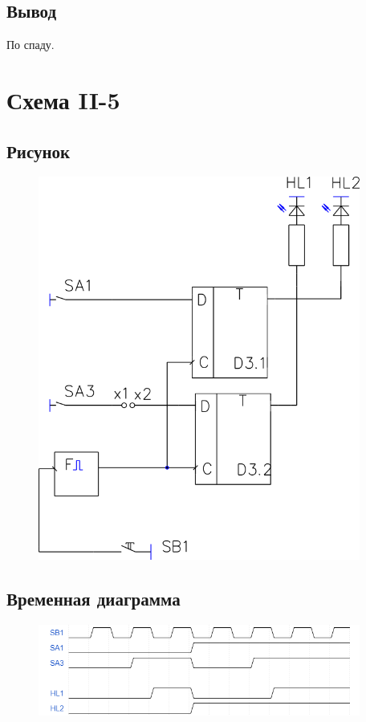 \documentclass[a4paper]{article}
\begin{document}
\subsection{Вывод}
По спаду.



\section{Схема II-5}



\subsection{Рисунок}
\begin{figure}[H]
    \centering
    \includegraphics[width=300pt]{s5.png}
\end{figure}

\subsection{Временная диаграмма}
\begin{figure}[H]
    \centering
    \includegraphics[width=300pt]{d5.png}
\end{figure}
\end{document}
